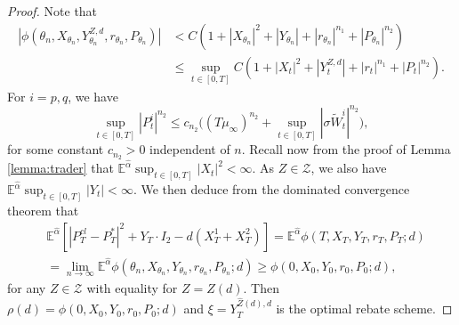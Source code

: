 \documentclass[10pt,a4paper]{amsart}
\begin{document}
\begin{proof}
Note that
\begin{align*}
|\phi(\theta_n,X_{\theta_n},Y^{Z,d}_{\theta_n}, r_{\theta_n},P_{\theta_n})| &< C(1+ |X_{\theta_n}|^{2}+|Y_{\theta_n}|+|r_{\theta_n}|^{n_1}+|P_{\theta_n}|^{n_2})\\
&\leq \sup_{t \in [0,T]} C(1+ |X_t|^{2}+|Y^{Z,d}_t|+|r_t|^{n_1}+|P_t|^{n_2}).\end{align*} For $i = p,q$, we have \[ \sup_{t \in [0,T]} |P^i_t|^{n_2} \leq c
_{n_2} \Big((T\mu_\infty)^{n_2}+  \sup_{t\in [0,T]} |\sigma \tilde W^i_t|^{n_2}\Big) ,\] for some constant $c_{n_2}>0$ independent of $n$. Recall now from the proof of Lemma \ref{lemma:trader} that $\mathbb{E}^{\hat\alpha} \sup_{t \in [0,T]} |X_t|^{2} < \infty$. As $Z \in \mathcal{Z}$, we also have $\mathbb{E}^{\hat\alpha} \sup_{t \in [0,T]} |Y_t| < \infty$. We then deduce from the dominated convergence theorem that  \begin{align*}
&\mathbb{E}^{\hat\alpha} [|P^{cl}_T - P_T^{*}|^2 + Y_T \cdot I_2 - d(X_T^1 + X_T^2)]= \mathbb{E}^{\hat\alpha} \phi(T,X_T,Y_T, r_T,P_T;d)\\
&= \lim_{n \to \infty} \mathbb{E}^{\hat\alpha} \phi(\theta_n,X_{\theta_n},Y_{\theta_n}, r_{\theta_n},P_{\theta_n};d) \geq \phi(0,X_0,Y_0,r_0,P_0;d),\end{align*} for any $Z\in \mathcal Z$ with equality for $Z=\hat Z(d)$. Then $\rho(d) = \phi(0,X_0,Y_0,r_0,P_0;d)$ and $\xi=Y_T^{\hat Z(d),d}$ is the optimal rebate scheme.
\end{proof}
\end{document}

